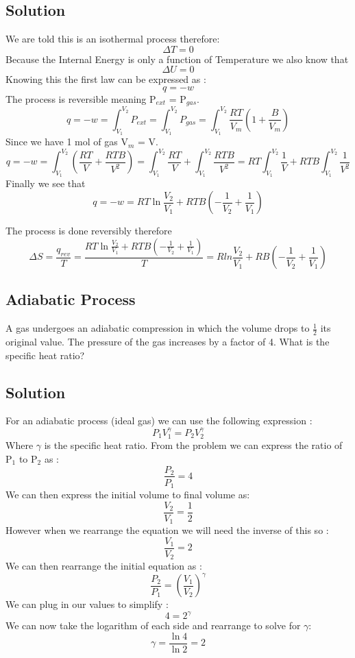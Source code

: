 \documentclass{article}
\newcommand{\be}{\begin{equation}}
\newcommand{\ee}{\end{equation}}
\begin{document}
\subsection*{Solution}
We are told this is an isothermal process therefore: 
\be
\Delta T = 0
\ee
Because the Internal Energy is only a function of Temperature we also know that
\be
\Delta U = 0 
\ee
Knowing this the first law can be expressed as : 
\be
q=-w
\ee
The process is reversible meaning  P$_{ext}$ = P$_{gas}$.
\be
q=-w=\int_{V_1}^{V_2} P_{ext} =  \int_{V_1}^{V_2} P_{gas}=\int_{V_1}^{V_2} \frac{RT}{V_m}\left(1 + \frac{B}{V_m}\right)
\ee
Since we have 1 mol of gas V$_m$ = V. 
\be
q=-w=\int_{V_1}^{V_2} \left(\frac{RT}{V}+ \frac{RTB}{V^2}\right) = \int_{V_1}^{V_2} \frac{RT}{V} +  \int_{V_1}^{V_2} \frac{RTB}{V^2} =  RT\int_{V_1}^{V_2} \frac{1}{V} +  RTB\int_{V_1}^{V_2} \frac{1}{V^2} 
\ee
Finally we see that 
\be
q=-w= RT\ln\frac{V_2}{V_1} + RTB\left(-\frac{1}{V_2} + \frac{1}{V_1}\right)
\ee

The process is done reversibly therefore
\be
\Delta S = \frac{q_{rev}}{T} = \frac{RT\ln\frac{V_2}{V_1} + RTB\left(-\frac{1}{V_2} + \frac{1}{V_1}\right)}{T} = Rln\frac{V_2}{V_1} + RB\left(-\frac{1}{V_2} + \frac{1}{V_1}\right)
\ee

\subsection*{Adiabatic Process}
A gas undergoes an adiabatic compression in which the volume drops to $\frac{1}{2}$ its original value. 
The pressure of the gas increases by a factor of 4. What is the specific heat ratio?

\subsection*{Solution}
For an adiabatic process (ideal gas) we can use the following expression : 
\be
P_1V_1^\gamma=P_2V_2^\gamma
\ee
Where $\gamma$ is the specific heat ratio.
From the problem we can express the ratio of P$_1$ to P$_2$ as : 
\be
\frac{P_2}{P_1} = 4 
\ee
We can then express the initial volume to final volume as:
\be
\frac{V_2}{V_1} = \frac{1}{2} 
\ee
However when we rearrange the equation we will need the inverse of this so : 
\be
\frac{V_1}{V_2} = 2 
\ee
We can then rearrange the initial equation as : 
\be
\frac{P_2}{P_1} = \left(\frac{V_1}{V_2}\right)^\gamma
\ee
We can plug in our values to simplify : 
\be
4=2^\gamma
\ee
We can now take the logarithm of each side and rearrange to solve for $\gamma$: 
\be
\gamma = \frac{\ln4}{\ln2} = 2 
\ee
\end{document}
